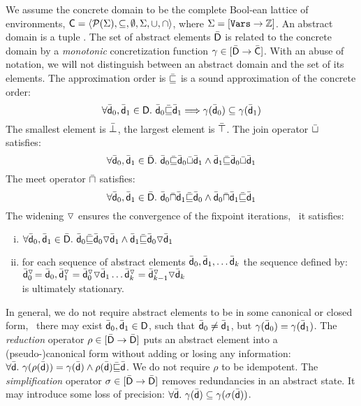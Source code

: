 \documentclass[sttt]{svjour}
\begin{document}
We assume the concrete domain to be the complete Bool-ean lattice of environments, ${\mathsf{C}} =  \langle \mathcal{P}{(\Sigma)}, \subseteq, \emptyset, \Sigma, \cup, \cap \rangle$, where $\Sigma = [\mathtt{Vars} \rightarrow\mathbb{Z}]$.
An abstract domain  is a tuple .
The set of abstract elements $\bar{\mathsf{\mathsf{D}}}$ is related to the concrete domain by a \emph{monotonic} concretization function $\gamma \in [\bar{\mathsf{\mathsf{D}}} \rightarrow\bar{\mathsf{\mathsf{C}}}]$.
With an abuse of notation, we will not distinguish between an abstract domain and the set of its elements.
The approximation order is $\bar{\sqsubseteq}$ is a sound approximation of the concrete order: 
\[
\forall \ael{d}_0, \ael{d}_1 \in \adom{D}.\ \ael{d}_0 \aless \ael{d}_1 \Longrightarrow \gamma(\ael{d}_0) \subseteq \gamma(\ael{d}_1)
\]
The smallest element is $\bar{\bot}$, the largest element is  $\bar{\top}$.
The join operator   $\bar{\sqcup}$  satisfies:
\[
\forall \ael{d}_0, \ael{d}_1 \in \ael{D}.\ \ael{d}_0 \aless \ael{d}_0 \ajoin \ael{d}_1 \wedge 
\ael{d}_1 \aless \ael{d}_0 \ajoin \ael{d}_1
\]
The meet operator $\bar{\sqcap}$ satisfies:
\[
\forall \ael{d}_0, \ael{d}_1 \in \ael{D}.\ \ael{d}_0 \ameet \ael{d}_1  \aless  \ael{d}_0 \wedge 
 \ael{d}_0 \ameet \ael{d}_1 \aless \ael{d}_1
\]
The widening  $\triangledown$ ensures the convergence of the fixpoint iterations, \ie\ it satisfies:
\begin{enumerate}[(i)]

 \item $ \forall \bar{\mathsf{\mathsf{d}}}_0, \bar{\mathsf{\mathsf{d}}}_1 \in \bar{\mathsf{\mathsf{D}}}.\ \bar{\mathsf{\mathsf{d}}}_0 \bar{\sqsubseteq} \bar{\mathsf{\mathsf{d}}}_0 \triangledown \bar{\mathsf{\mathsf{d}}}_1 \wedge  \bar{\mathsf{\mathsf{d}}}_1 \bar{\sqsubseteq} \bar{\mathsf{\mathsf{d}}}_0 \triangledown \bar{\mathsf{\mathsf{d}}}_1$
 \item for each sequence of abstract elements $\bar{\mathsf{\mathsf{d}}}_0, \bar{\mathsf{\mathsf{d}}}_1, \dots \bar{\mathsf{\mathsf{d}}}_k $ the sequence defined by: \\
 $\bar{\mathsf{\mathsf{d}}}_0^{\triangledown}\! = \bar{\mathsf{\mathsf{d}}}_0, \bar{\mathsf{\mathsf{d}}}_1^{\triangledown} = \bar{\mathsf{\mathsf{d}}}^{\triangledown}_0 \triangledown \bar{\mathsf{\mathsf{d}}}_1  \dots \bar{\mathsf{\mathsf{d}}}^{\triangledown}_k = \bar{\mathsf{\mathsf{d}}}^{\triangledown}_{k-1} \triangledown \bar{\mathsf{\mathsf{d}}}_{k} $ \\
 is ultimately stationary.
\end{enumerate}
In general, we do not require abstract elements to be in some canonical or closed form, \ie\ there may exist $\bar{\mathsf{\mathsf{d}}}_0, \bar{\mathsf{\mathsf{d}}}_1 \in {\mathsf{D}}$, such that $\bar{\mathsf{\mathsf{d}}}_0 \neq \bar{\mathsf{\mathsf{d}}}_1$, but $\gamma(\bar{\mathsf{\mathsf{d}}}_0) = \gamma(\bar{\mathsf{\mathsf{d}}}_1)$.
The \emph{reduction} operator $\rho \in [\bar{\mathsf{\mathsf{D}}} \rightarrow\bar{\mathsf{\mathsf{D}}}]$ puts an abstract element into a (pseudo-)canonical form without adding or losing any information: $\forall \bar{\mathsf{\mathsf{d}}}.\  \gamma(\rho(\bar{\mathsf{\mathsf{d}}})) = \gamma(\bar{\mathsf{\mathsf{d}}}) \wedge \rho(\bar{\mathsf{\mathsf{d}}}) \bar{\sqsubseteq} \bar{\mathsf{\mathsf{d}}}$. 
We do not require $\rho$ to be idempotent.
The \emph{simplification} operator $\sigma \in [\bar{\mathsf{\mathsf{D}}} \rightarrow\bar{\mathsf{\mathsf{D}}}]$ removes  redundancies in an abstract state. 
It may introduce some loss of precision: $\forall \bar{\mathsf{\mathsf{d}}}.\ \gamma(\bar{\mathsf{\mathsf{d}}}) \subseteq \gamma(\sigma(\bar{\mathsf{\mathsf{d}}}))$.
\end{document}
